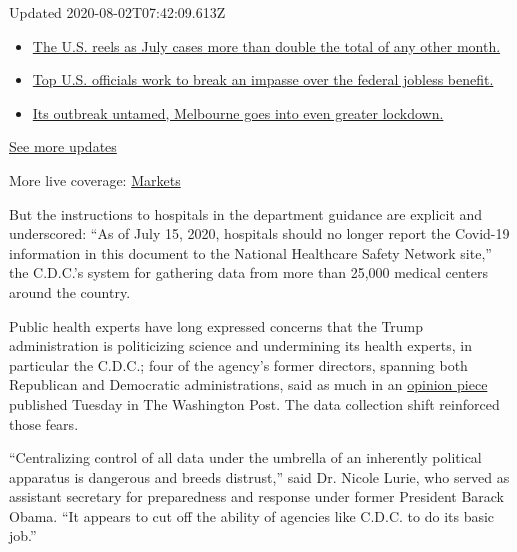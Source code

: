 Updated 2020-08-02T07:42:09.613Z

\begin{itemize}
\tightlist
\item
  \href{https://www.nytimes.com/2020/08/01/world/coronavirus-covid-19.html?action=click\&pgtype=Article\&state=default\&region=MAIN_CONTENT_1\&context=storylines_live_updates\#link-34047410}{The
  U.S. reels as July cases more than double the total of any other
  month.}
\item
  \href{https://www.nytimes.com/2020/08/01/world/coronavirus-covid-19.html?action=click\&pgtype=Article\&state=default\&region=MAIN_CONTENT_1\&context=storylines_live_updates\#link-780ec966}{Top
  U.S. officials work to break an impasse over the federal jobless
  benefit.}
\item
  \href{https://www.nytimes.com/2020/08/01/world/coronavirus-covid-19.html?action=click\&pgtype=Article\&state=default\&region=MAIN_CONTENT_1\&context=storylines_live_updates\#link-2bc8948}{Its
  outbreak untamed, Melbourne goes into even greater lockdown.}
\end{itemize}

\href{https://www.nytimes.com/2020/08/01/world/coronavirus-covid-19.html?action=click\&pgtype=Article\&state=default\&region=MAIN_CONTENT_1\&context=storylines_live_updates}{See
more updates}

More live coverage:
\href{https://www.nytimes.com/live/2020/07/31/business/stock-market-today-coronavirus?action=click\&pgtype=Article\&state=default\&region=MAIN_CONTENT_1\&context=storylines_live_updates}{Markets}

But the instructions to hospitals in the department guidance are
explicit and underscored: ``As of July 15, 2020, hospitals should no
longer report the Covid-19 information in this document to the National
Healthcare Safety Network site,'' the C.D.C.'s system for gathering data
from more than 25,000 medical centers around the country.

Public health experts have long expressed concerns that the Trump
administration is politicizing science and undermining its health
experts, in particular the C.D.C.; four of the agency's former
directors, spanning both Republican and Democratic administrations, said
as much in an
\href{https://www.washingtonpost.com/outlook/2020/07/14/cdc-directors-trump-politics/}{opinion
piece} published Tuesday in The Washington Post. The data collection
shift reinforced those fears.

``Centralizing control of all data under the umbrella of an inherently
political apparatus is dangerous and breeds distrust,'' said Dr. Nicole
Lurie, who served as assistant secretary for preparedness and response
under former President Barack Obama. ``It appears to cut off the ability
of agencies like C.D.C. to do its basic job.''


